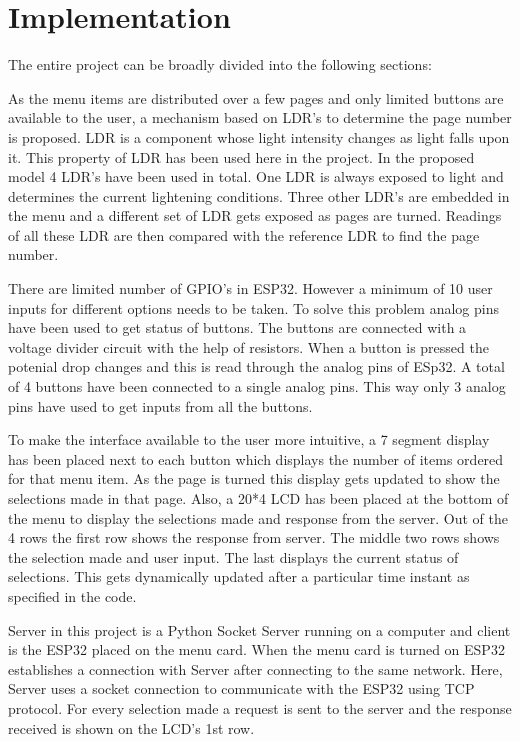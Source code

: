 \documentclass[12pt,a4paper]{article}
\begin{document}
		\section{Implementation}
		The entire project can be broadly divided into the following sections:
		\begin{info}
		As the menu items are distributed over a few pages and only limited buttons are available to the user, a mechanism based on LDR's to determine the page number is proposed. LDR is a component whose light intensity changes as light falls upon it. This property of LDR has been used here in the project. In the proposed model 4 LDR's have been used in total. One LDR is always exposed to light and determines the current lightening conditions. Three other LDR's are embedded in the menu and a different set of LDR gets exposed as pages are turned. Readings of all these LDR are then compared with the reference LDR to find the page number.
		
		\end{info}
		\begin{info}
		There are limited number of GPIO's in ESP32. However a minimum of 10 user inputs for different options needs to be taken. To solve this problem analog pins have been used to get status of buttons. The buttons are connected with a voltage divider circuit with the help of resistors. When a button is pressed the potenial drop changes and this is read through the analog pins of ESp32. A total of 4 buttons have been connected to a single analog pins. This way only 3 analog pins have used to get inputs from all the buttons.
		
		\end{info}
		\begin{info}
		To make the interface available to the user more intuitive, a 7 segment display has been placed next to each button which displays the number of items ordered for that menu item. As the page is turned this display gets updated to show  the selections made in that page. Also, a 20*4 LCD has been placed at the bottom of the menu to display the selections made and response from the server. Out of the 4 rows the first row shows the response from server. The middle two rows shows the selection made and user input. The last displays the current status of selections. This gets dynamically updated after a particular time instant as specified in the code.
		\end{info}
		\begin{info}
		Server in this project is a Python Socket Server running on a computer and client is the ESP32 placed on the menu card. When the menu card is turned on ESP32 establishes a connection with Server after connecting to the same network. Here, Server uses a socket connection to communicate with the ESP32 using TCP protocol. For every selection made a request is sent to the server and the response received is shown on the LCD's 1st row.
		
		\end{info}
		
\end{document}
